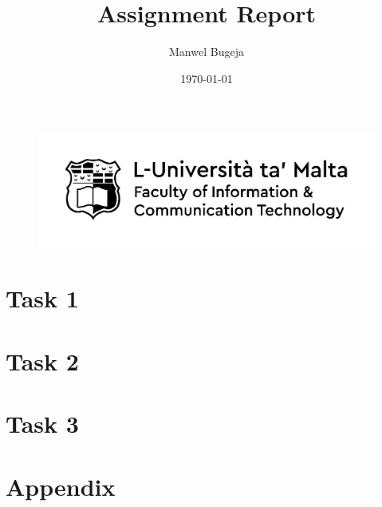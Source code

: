 \documentclass[a4paper, 12pt]{report}
\begin{document}
\begin{figure}
    \centering
    \includegraphics[width=1\textwidth]{logo}
\end{figure}

\title{Assignment Report}
\author{Manwel Bugeja}
\date{\today}
\maketitle

\tableofcontents
\newpage


\section{Task 1}
\section{Task 2}
\section{Task 3}
\section{Appendix}

% 
\end{document}
